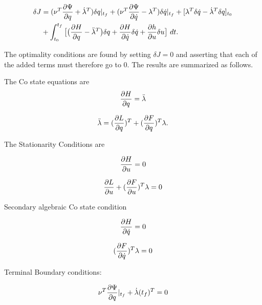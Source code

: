 \begin{equation}
\begin{split}
    \delta J &= (\nu^T\frac{\partial \Psi}{\partial q} + \dot \lambda^T) \delta q |_{t_f}
                 + (\nu^T\frac{\partial \Psi}{\partial \dot q} - \lambda^T) \delta \dot q |_{t_f}
                 +  [ \lambda^T  \delta \dot q - \dot \lambda^T \delta q]_{t_0}\\
              & + \int_{t_0}^{t_f} \big[ \big( \frac{\partial H}{\partial q} - \ddot \lambda^T \big) \delta q
                                              + \frac{\partial H}{\partial \dot q} \delta \dot q +  \frac{\partial h}{\partial u} \delta u \big] \text{  } dt.\\
\end{split}
\end{equation}


The optimality conditions are found by setting $\delta J = 0 $ and asserting that each of the added terms must therefore go to 0. The results are summarized as follows.

The Co state equations are
\begin{equation}
    \label{costate}
    \frac{\p H}{ \p q } = \ddot \lambda
\end{equation}

\begin{equation}
    \ddot \lambda = ( \frac{\partial L}{\partial q}  )^T + ( \frac{\partial F}{\partial q} )^T \lambda .
\end{equation}

The Stationarity Conditions are

\begin{equation}
    \frac{\partial H}{\partial u} = 0
\end{equation}

\begin{equation}
    \frac{\partial L}{\partial u} +( \frac{\partial F}{\partial u} )^T \lambda = 0
\end{equation}



Secondary algebraic Co state condition

\begin{equation}
    \frac{\partial H}{\partial \dot q} = 0
\end{equation}

\begin{equation}
    (\frac{\partial F}{\partial \dot q})^T \lambda = 0
\end{equation}


Terminal Boundary conditions:

\begin{equation}
    \nu^T \frac{\partial \Psi}{\partial q}|_{t_f} + \dot \lambda(t_f)^T = 0
\end{equation}

